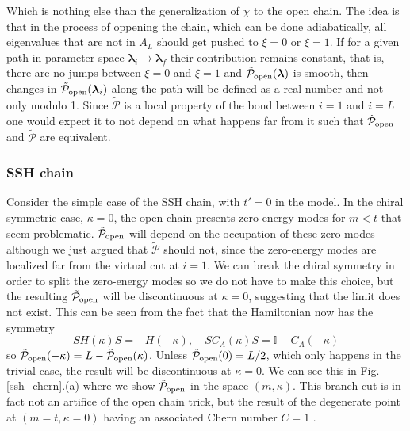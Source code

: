\documentclass[twocolumn,amsmath,longbibliography,amssymb,superscriptaddress]{revtex4-1}
\begin{document}
Which is nothing else than the generalization of $\chi$ to the open chain. The idea is that in the process of oppening the chain, which can be done adiabatically, all eigenvalues that are not in $A_L$ should get pushed to $\xi=0$ or $\xi=1$. If for a given path in parameter space $\boldsymbol{\lambda}_i \rightarrow \boldsymbol{\lambda}_f$ their contribution remains constant, that is, there are no jumps between $\xi=0$ and $\xi=1$ and $\tilde{\mathcal{P}}_{\rm open} (\boldsymbol{\lambda} )$ is smooth, then changes in $\tilde{\mathcal{P}}_{\rm open}(\boldsymbol{\lambda}_i ) $ along the path will be defined as a real number and not only modulo 1. Since $\tilde{\mathcal{P}}$ is a local property of the bond between $i=1$ and $i=L$ one would expect it to not depend on what happens far from it such that $\tilde{\mathcal{P}}_{\rm open}$ and $\tilde{\mathcal{P}}$ are equivalent. 

\subsubsection{SSH chain}

Consider the simple case of the SSH chain, with $t'=0$ in the model. In the chiral symmetric case, $\kappa = 0$, the open chain presents zero-energy modes for $m<t$ that seem problematic. $\tilde{\mathcal{P}}_{\rm open}$  will depend on the occupation of these zero modes although we just argued that $\tilde{\mathcal{P}}$ should not, since the zero-energy modes are localized far from the virtual cut at $i=1$. We can break the chiral symmetry in order to split the zero-energy modes so we do not have to make this choice, but the resulting $\tilde{\mathcal{P}}_{\rm open}$ will be discontinuous at $\kappa = 0$, suggesting that the limit does not exist. This can be seen from the fact that the Hamiltonian now has the symmetry
\begin{equation}
SH(\kappa)S = -H(-\kappa), \quad S C_A(\kappa) S = \mathbb{I}-C_A(-\kappa)
\end{equation}
so $\tilde{\mathcal{P}}_{\rm open}(-\kappa) = L-\tilde{\mathcal{P}}_{\rm open}(\kappa)$. Unless $\tilde{\mathcal{P}}_{\rm open}(0) = L/2$, which only happens in the trivial case, the result will be discontinuous at $\kappa = 0$. We can see this in Fig.\ref{ssh_chern}.(a) where we show $\tilde{\mathcal{P}}_{\rm open}$ in the space $(m,\kappa)$. This branch cut is in fact not an artifice of the open chain trick, but the result of the degenerate point at $(m=t,\kappa=0)$ having an associated Chern number $C=1$ \cite{Asboth2016}.
\end{document}
